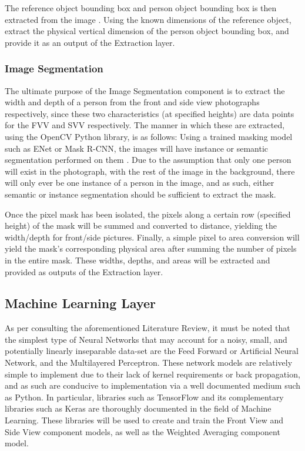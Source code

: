 \documentclass[conference]{IEEEtran}
\begin{document}
The reference object bounding box and person object bounding box is then extracted from the image \cite{objectDetection}.
Using the known dimensions of the reference object, extract the physical vertical dimension of the person object bounding box, and provide it as an output of the Extraction layer.
\subsubsection{Image Segmentation}
The ultimate purpose of the Image Segmentation component is to extract the width and depth of a person from the front and side view photographs respectively, since these two characteristics (at specified heights) are data points for the FVV and SVV respectively.
The manner in which these are extracted, using the OpenCV Python library, is as follows:
Using a trained masking model such as ENet or Mask R-CNN, the images will have instance or semantic segmentation performed on them \cite{semantic, instance}.
Due to the assumption that only one person will exist in the photograph, with the rest of the image in the background, there will only ever be one instance of a person in the image, and as such, either semantic or instance segmentation should be sufficient to extract the mask.

Once the pixel mask has been isolated, the pixels along a certain row (specified height) of the mask will be summed and converted to distance, yielding the width/depth for front/side pictures.
Finally, a simple pixel to area conversion will yield the mask's corresponding physical area after summing the number of pixels in the entire mask.
These widths, depths, and areas will be extracted and provided as outputs of the Extraction layer.
\subsection{Machine Learning Layer}
As per consulting the aforementioned Literature Review, it must be noted that the simplest type of Neural Networks that may account for a noisy, small, and potentially linearly inseparable data-set are the Feed Forward or Artificial Neural Network, and the Multilayered Perceptron.
These network models are relatively simple to implement due to their lack of kernel requirements or back propagation, and as such are conducive to implementation via a well documented medium such as Python.
In particular, libraries such as TensorFlow and its complementary libraries such as Keras are thoroughly documented in the field of Machine Learning.
These libraries will be used to create and train the Front View and Side View component models, as well as the Weighted Averaging component model.
\end{document}
